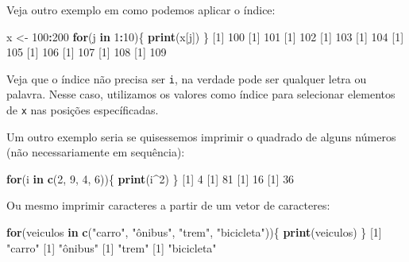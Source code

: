 \documentclass[10pt,a4paper]{book}
\newenvironment{Shaded}{\begin{snugshade}}{\end{snugshade}}
\newcommand{\KeywordTok}[1]{\textcolor[rgb]{0.13,0.29,0.53}{\textbf{#1}}}
\newcommand{\DecValTok}[1]{\textcolor[rgb]{0.00,0.00,0.81}{#1}}
\newcommand{\StringTok}[1]{\textcolor[rgb]{0.31,0.60,0.02}{#1}}
\newcommand{\ControlFlowTok}[1]{\textcolor[rgb]{0.13,0.29,0.53}{\textbf{#1}}}
\newcommand{\OperatorTok}[1]{\textcolor[rgb]{0.81,0.36,0.00}{\textbf{#1}}}
\newcommand{\NormalTok}[1]{#1}
\begin{document}
Veja outro exemplo em como podemos aplicar o índice:

\begin{Shaded}
\begin{Highlighting}[]
\NormalTok{x <-}\StringTok{ }\DecValTok{100}\OperatorTok{:}\DecValTok{200}
\ControlFlowTok{for}\NormalTok{(j }\ControlFlowTok{in} \DecValTok{1}\OperatorTok{:}\DecValTok{10}\NormalTok{)\{}
    \KeywordTok{print}\NormalTok{(x[j])}
\NormalTok{\}}
\NormalTok{[}\DecValTok{1}\NormalTok{] }\DecValTok{100}
\NormalTok{[}\DecValTok{1}\NormalTok{] }\DecValTok{101}
\NormalTok{[}\DecValTok{1}\NormalTok{] }\DecValTok{102}
\NormalTok{[}\DecValTok{1}\NormalTok{] }\DecValTok{103}
\NormalTok{[}\DecValTok{1}\NormalTok{] }\DecValTok{104}
\NormalTok{[}\DecValTok{1}\NormalTok{] }\DecValTok{105}
\NormalTok{[}\DecValTok{1}\NormalTok{] }\DecValTok{106}
\NormalTok{[}\DecValTok{1}\NormalTok{] }\DecValTok{107}
\NormalTok{[}\DecValTok{1}\NormalTok{] }\DecValTok{108}
\NormalTok{[}\DecValTok{1}\NormalTok{] }\DecValTok{109}
\end{Highlighting}
\end{Shaded}

Veja que o índice não precisa ser \texttt{i}, na verdade pode ser
qualquer letra ou palavra. Nesse caso, utilizamos os valores como índice
para selecionar elementos de \texttt{x} nas posições específicadas.

Um outro exemplo seria se quisessemos imprimir o quadrado de alguns
números (não necessariamente em sequência):

\begin{Shaded}
\begin{Highlighting}[]
\ControlFlowTok{for}\NormalTok{(i }\ControlFlowTok{in} \KeywordTok{c}\NormalTok{(}\DecValTok{2}\NormalTok{, }\DecValTok{9}\NormalTok{, }\DecValTok{4}\NormalTok{, }\DecValTok{6}\NormalTok{))\{}
    \KeywordTok{print}\NormalTok{(i}\OperatorTok{^}\DecValTok{2}\NormalTok{)}
\NormalTok{\}}
\NormalTok{[}\DecValTok{1}\NormalTok{] }\DecValTok{4}
\NormalTok{[}\DecValTok{1}\NormalTok{] }\DecValTok{81}
\NormalTok{[}\DecValTok{1}\NormalTok{] }\DecValTok{16}
\NormalTok{[}\DecValTok{1}\NormalTok{] }\DecValTok{36}
\end{Highlighting}
\end{Shaded}

Ou mesmo imprimir caracteres a partir de um vetor de caracteres:

\begin{Shaded}
\begin{Highlighting}[]
\ControlFlowTok{for}\NormalTok{(veiculos }\ControlFlowTok{in} \KeywordTok{c}\NormalTok{(}\StringTok{"carro"}\NormalTok{, }\StringTok{"ônibus"}\NormalTok{, }\StringTok{"trem"}\NormalTok{, }\StringTok{"bicicleta"}\NormalTok{))\{}
    \KeywordTok{print}\NormalTok{(veiculos)}
\NormalTok{\}}
\NormalTok{[}\DecValTok{1}\NormalTok{] }\StringTok{"carro"}
\NormalTok{[}\DecValTok{1}\NormalTok{] }\StringTok{"ônibus"}
\NormalTok{[}\DecValTok{1}\NormalTok{] }\StringTok{"trem"}
\NormalTok{[}\DecValTok{1}\NormalTok{] }\StringTok{"bicicleta"}
\end{Highlighting}
\end{Shaded}
\end{document}
